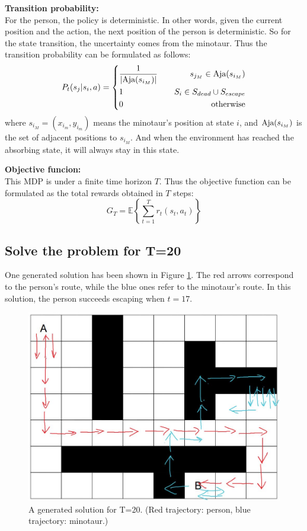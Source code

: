\documentclass{article}
\begin{document}
\textbf{Transition probability:} \\
For the person, the policy is deterministic. In other words, given the current position and the action, the next position of the person is deterministic.
So for the state transition, the uncertainty comes from the minotaur. Thus the transition probability can be formulated as follows:
$$P_t(s_j|s_i,a)=\left\{\begin{aligned}
  &\frac{1}{|\textup{Aja}(s_{i_M})|} \quad &s_{j_M}\in \textup{Aja}(s_{i_M}) \\
  &1 \quad &S_i\in S_{dead}\cup S_{escape} \\
  &0 \quad &\textup{otherwise}
\end{aligned}\right.$$
where $s_{i_M}=(x_{i_m},y_{i_m})$ means the minotaur's position at state $i$, and $\textup{Aja}(s_{i_M})$ is the set of adjacent positions to $s_{i_M}$.
And when the environment has reached the absorbing state, it will always stay in this state.
\newline

\textbf{Objective funcion:} \\
This MDP is under a finite time horizon $T$. Thus the objective function can be formulated as the total rewards obtained in $T$ steps:
$$G_T=\mathbb{E}\left\{\sum_{t=1}^T r_t(s_t,a_t)\right\}$$

\subsection{Solve the problem for T=20}
One generated solution has been shown in Figure \ref{solution}.
The red arrows correspond to the person's route, while the blue ones refer to the minotaur's route.
In this solution, the person succeeds escaping when $t=17$.
\begin{figure}[h]
  \centering
  \includegraphics[scale=0.4]{solution.jpg}
  \caption{A generated solution for T=20. (Red trajectory: person, blue trajectory: minotaur.)}
  \label{solution}
\end{figure}
\end{document}
